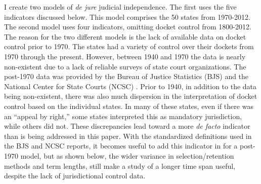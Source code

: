 \documentclass[12pt]{article}
\begin{document}
I create two models of \textit{de jure} judicial independence.  The first uses the five indicators discussed below.  This model comprises the 50 states from 1970-2012.  The second model uses four indicators, omitting docket control from 1800-2012.  The reason for the two different models is the lack of available data on docket control prior to 1970.  The states had a variety of control over their dockets from 1970 through the present.  However, between 1940 and 1970 the data is nearly non-existent due to a lack of reliable surveys of state court organizations.  The post-1970 data was provided by the Bureau of Justice Statistics (BJS) and the National Center for State Courts (NCSC) \citep{BJS1993,BJS1998,BJS2004}.  Prior to 1940, in addition to the data being non-existent, there was also much dispersion in the interpretation of docket control based on the individual states.  In many of these states, even if there was an ``appeal by right,'' some states interpreted this as mandatory jurisdiction, while others did not.  These discrepancies lead toward a more \textit{de facto} indicator than is being addressed in this paper.  With the standardized definitions used in the BJS and NCSC reports, it becomes useful to add this indicator in for a post-1970 model, but as shown below, the wider variance in selection/retention methods and term lengths, still make a study of a longer time span useful, despite the lack of jurisdictional control data.  
\end{document}
